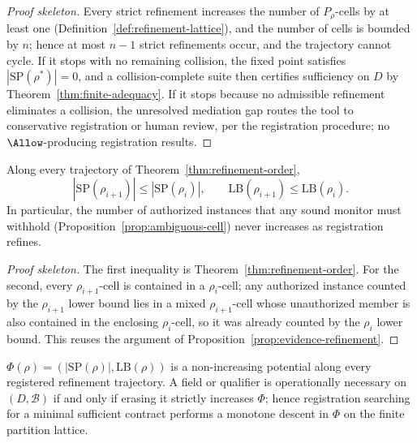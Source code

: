 \begin{proof}[Proof skeleton]
Every strict refinement increases the number of $P_\rho$-cells by at least one
(Definition~\ref{def:refinement-lattice}), and the number of cells is bounded
by $n$; hence at most $n-1$ strict refinements occur, and the trajectory
cannot cycle. If it stops with no remaining collision, the fixed point
satisfies $|\mathrm{SP}(\rho^\ast)|=0$, and a collision-complete suite then
certifies sufficiency on $D$ by Theorem~\ref{thm:finite-adequacy}. If it stops
because no admissible refinement eliminates a collision, the unresolved
mediation gap routes the tool to conservative registration or human review,
per the registration procedure; no $\Allow$-producing registration results.
\end{proof}

\begin{theorem}
\label{thm:refinement-collision-monotone}
Along every trajectory of Theorem~\ref{thm:refinement-order},
\[
  |\mathrm{SP}(\rho_{i+1})|\le|\mathrm{SP}(\rho_i)|,
  \qquad
  \mathrm{LB}(\rho_{i+1})\le\mathrm{LB}(\rho_i).
\]
In particular, the number of authorized instances that any sound monitor must
withhold (Proposition~\ref{prop:ambiguous-cell}) never increases as
registration refines.
\end{theorem}

\begin{proof}[Proof skeleton]
The first inequality is Theorem~\ref{thm:refinement-order}. For the second,
every $\rho_{i+1}$-cell is contained in a $\rho_i$-cell; any authorized
instance counted by the $\rho_{i+1}$ lower bound lies in a mixed
$\rho_{i+1}$-cell whose unauthorized member is also contained in the enclosing
$\rho_i$-cell, so it was already counted by the $\rho_i$ lower bound. This
reuses the argument of Proposition~\ref{prop:evidence-refinement}.
\end{proof}

\begin{corollary}
\label{cor:refinement-monotone-search}
$\Phi(\rho)=(|\mathrm{SP}(\rho)|,\mathrm{LB}(\rho))$ is a non-increasing
potential along every registered refinement trajectory. A field or qualifier
is operationally necessary on $(D,\mathcal{B})$ if and only if erasing it
strictly increases $\Phi$; hence registration searching for a minimal
sufficient contract performs a monotone descent in $\Phi$ on the finite
partition lattice.
\end{corollary}

